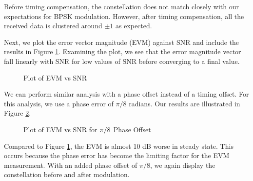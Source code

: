 \documentclass{article}
\begin{document}
\noindent Before timing compensation, the constellation does not match closely with our expectations for BPSK modulation. However, after timing compensation, all the received data is clustered around $\pm 1$ as expected.

Next, we plot the error vector magnitude (EVM) against SNR and include the results in Figure \ref{fig::evm_vs_snr}. Examining the plot, we see that the error magnitude vector fall linearly with SNR for low values of SNR before converging to a final value.
\begin{figure}[H]
	\centerline{}
	\caption{Plot of EVM vs SNR}
	\label{fig::evm_vs_snr}
\end{figure}

\noindent We can perform similar analysis with a phase offset instead of a timing offset. For this analysis, we use a phase error of $\pi/8$ radians. Our results are illustrated in Figure \ref{fig::evm_vs_snr_with_phase_offset}.

\begin{figure}[H]
	\centerline{}
	\caption{Plot of EVM vs SNR for $\protect\pi/8$ Phase Offset}
	\label{fig::evm_vs_snr_with_phase_offset}
\end{figure}

\noindent Compared to Figure \ref{fig::evm_vs_snr}, the EVM is almost 10 dB worse in steady state. This occurs because the phase error has become the limiting factor for the EVM measurement. With an added phase offset of $\pi/8$, we again display the constellation before and after modulation.
\end{document}
